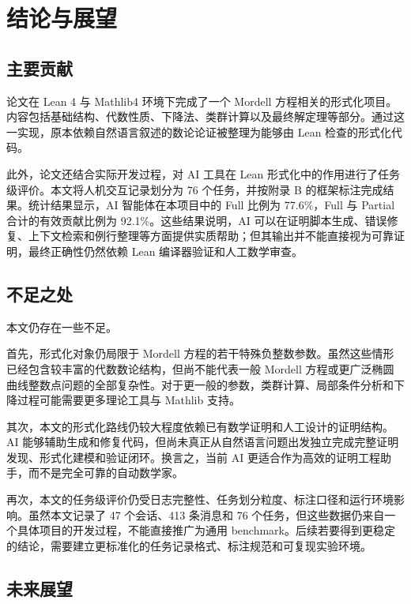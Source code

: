 \newpage
{}
\section{结论与展望}

\subsection{主要贡献}

论文在 Lean 4 与 Mathlib4 环境下完成了一个 Mordell 方程相关的形式化项目。内容包括基础结构、代数性质、下降法、类群计算以及最终解定理等部分。通过这一实现，原本依赖自然语言叙述的数论论证被整理为能够由 Lean 检查的形式化代码。

此外，论文还结合实际开发过程，对 AI 工具在 Lean 形式化中的作用进行了任务级评价。本文将人机交互记录划分为 76 个任务，并按附录 B 的框架标注完成结果。统计结果显示，AI 智能体在本项目中的 Full 比例为 77.6\%，Full 与 Partial 合计的有效贡献比例为 92.1\%。这些结果说明，AI 可以在证明脚本生成、错误修复、上下文检索和例行整理等方面提供实质帮助；但其输出并不能直接视为可靠证明，最终正确性仍然依赖 Lean 编译器验证和人工数学审查。

\subsection{不足之处}

本文仍存在一些不足。

首先，形式化对象仍局限于 Mordell 方程的若干特殊负整数参数。虽然这些情形已经包含较丰富的代数数论结构，但尚不能代表一般 Mordell 方程或更广泛椭圆曲线整数点问题的全部复杂性。对于更一般的参数，类群计算、局部条件分析和下降过程可能需要更多理论工具与 Mathlib 支持。

其次，本文的形式化路线仍较大程度依赖已有数学证明和人工设计的证明结构。AI 能够辅助生成和修复代码，但尚未真正从自然语言问题出发独立完成完整证明发现、形式化建模和验证闭环。换言之，当前 AI 更适合作为高效的证明工程助手，而不是完全可靠的自动数学家。

再次，本文的任务级评价仍受日志完整性、任务划分粒度、标注口径和运行环境影响。虽然本文记录了 47 个会话、413 条消息和 76 个任务，但这些数据仍来自一个具体项目的开发过程，不能直接推广为通用 benchmark。后续若要得到更稳定的结论，需要建立更标准化的任务记录格式、标注规范和可复现实验环境。

\subsection{未来展望}

